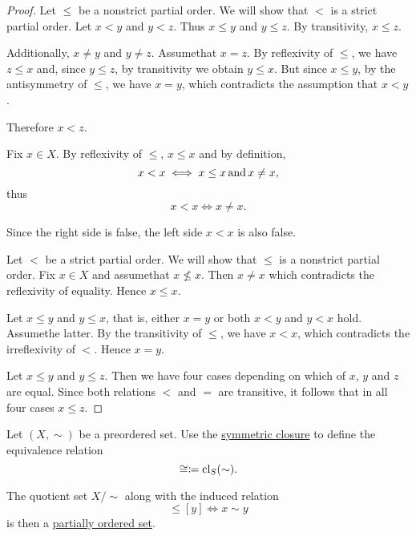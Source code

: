 \begin{proof}
   Let \( \leq \) be a nonstrict partial order. We will show that \( < \) is a strict partial order.
   Let \( x < y \) and \( y < z \). Thus \( x \leq y \) and \( y \leq z \). By transitivity, \( x \leq z \).

  Additionally, \( x \neq y \) and \( y \neq z \). Assume\LEM that \( x = z \). By reflexivity of \( \leq \), we have \( z \leq x \) and, since \( y \leq z \), by transitivity we obtain \( y \leq x \). But since \( x \leq y \), by the antisymmetry of \( \leq \), we have \( x = y \), which contradicts the assumption that \( x < y \).

  Therefore \( x < z \).

   Fix \( x \in X \). By reflexivity of \( \leq \), \( x \leq x \) and by definition,
  \begin{equation*}
    x < x \iff x \leq x \mathop{\text{and}} x \neq x,
  \end{equation*}
  thus
  \begin{equation*}
    x < x \iff x \neq x.
  \end{equation*}

  Since the right side is false, the left side \( x < x \) is also false.

   Let \( < \) be a strict partial order. We will show that \( \leq \) is a nonstrict partial order.
   Fix \( x \in X \) and assume\LEM that \( x \not\leq x \). Then \( x \neq x \) which contradicts the reflexivity of equality. Hence \( x \leq x \).

   Let \( x \leq y \) and \( y \leq x \), that is, either \( x = y \) or both \( x < y \) and \( y < x \) hold. Assume\LEM the latter. By the transitivity of \( \leq \), we have \( x < x \), which contradicts the irreflexivity of \( < \). Hence \( x = y \).

   Let \( x \leq y \) and \( y \leq z \). Then we have four cases depending on which of \( x \), \( y \) and \( z \) are equal. Since both relations \( < \) and \( = \) are transitive, it follows that in all four cases \( x \leq z \).
\end{proof}

\begin{proposition}\label{thm:preorder_to_partial_order}
  Let \( (X, \sim) \) be a preordered set. Use the \hyperref[def:derived_relations/symmetric]{symmetric closure} to define the equivalence relation
  \begin{equation*}
    \cong \coloneqq \operatorname{cl}_S(\sim).
  \end{equation*}

  The quotient set \( X / \sim \) along with the induced relation
  \begin{equation*}
    [x] \leq [y] \iff x \sim y
  \end{equation*}
  is then a \hyperref[def:poset]{partially ordered set}.
\end{proposition}

